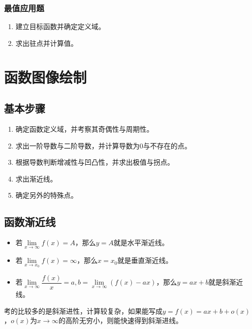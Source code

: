 \documentclass[UTF8, 12pt]{ctexart}
\begin{document}
        \subsubsection{最值应用题}

        \begin{enumerate}
            \item 建立目标函数并确定定义域。
            \item 求出驻点并计算值。
        \end{enumerate}

        \section{函数图像绘制}

        \subsection{基本步骤}

        \begin{enumerate}
            \item 确定函数定义域，并考察其奇偶性与周期性。
            \item 求出一阶导数与二阶导数，并计算导数为0与不存在的点。
            \item 根据导数判断增减性与凹凸性，并求出极值与拐点。
            \item 求出渐近线。
            \item 确定另外的特殊点。
        \end{enumerate}

        \subsection{函数渐近线}

        \begin{itemize}
            \item 若$\lim\limits_{x\to\infty}f(x)=A$，那么$y=A$就是水平渐近线。
            \item 若$\lim\limits_{x\to x_0}f(x)=\infty$，那么$x=x_0$就是垂直渐近线。
            \item 若$\lim\limits_{x\to\infty}\dfrac{f(x)}{x}=a,b=\lim\limits_{x\to\infty}(f(x)-ax)$，那么$y=ax+b$就是斜渐近线。
        \end{itemize}

        考的比较多的是斜渐进性，计算较复杂，如果能写成$y=f(x)=ax+b+o(x)$，$o(x)$为$x\to\infty$的高阶无穷小，则能快速得到斜渐进线。
\end{document}
